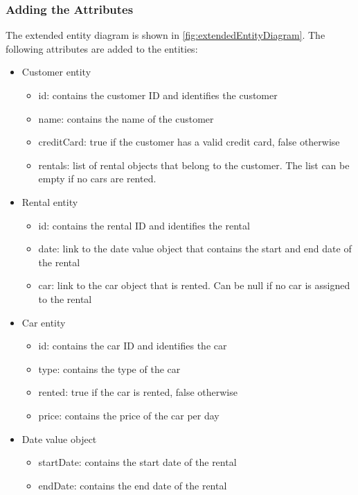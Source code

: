 \subsubsection*{Adding the Attributes}
The extended entity diagram is shown in \autoref{fig:extendedEntityDiagram}.
The following attributes are added to the entities:
\begin{itemize}
    \item Customer entity
    \begin{itemize}
        \item id: contains the customer ID and identifies the customer
        \item name: contains the name of the customer
        \item creditCard: true if the customer has a valid credit card, false otherwise
        \item rentals: list of rental objects that belong to the customer. The list can be empty if no cars are rented.
    \end{itemize}
    \item Rental entity
    \begin{itemize}
        \item id: contains the rental ID and identifies the rental
        \item date: link to the date value object that contains the start and end date of the rental
        \item car: link to the car object that is rented. Can be null if no car is assigned to the rental
    \end{itemize}
    \item Car entity
    \begin{itemize}
        \item id: contains the car ID and identifies the car
        \item type: contains the type of the car
        \item rented: true if the car is rented, false otherwise
        \item price: contains the price of the car per day
    \end{itemize}
    \item Date value object
    \begin{itemize}
        \item startDate: contains the start date of the rental
        \item endDate: contains the end date of the rental
    \end{itemize}
\end{itemize}

